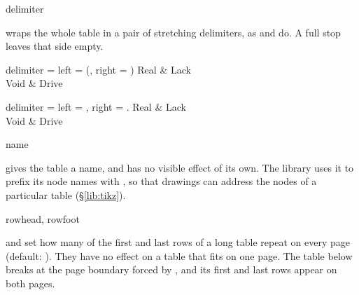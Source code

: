 \begin{codedescribe}[
    key,
    new=2022D
  ]{delimiter}
  \begin{codesyntax}
  \end{codesyntax}
   wraps the whole table in a pair of stretching delimiters, as  and  do. A full stop leaves that side empty.

  \begin{codestore}[st=table:delimiter]
    \begin{tblr}{delimiter = {left = (, right = )}}
      Real & Lack  \\
      Void & Drive
    \end{tblr}\quad
    \begin{tblr}{delimiter = {left = \lbrace, right = .}}
      Real & Lack  \\
      Void & Drive
    \end{tblr}\end{codestore}
  \begin{center}
  \end{center}
\end{codedescribe}

\begin{codedescribe}[
    key,
    new=2025A
  ]{name}
  \begin{codesyntax}
  \end{codesyntax}
   gives the table a name, and has no visible effect of its own. The  library uses it to prefix its node names with \vrb{-}, so that drawings can address the nodes of a particular table (\S\ref{lib:tikz}).
\end{codedescribe}

\begin{codedescribe}[
    key,
    new=2021L
  ]{rowhead, rowfoot}
  \begin{codesyntax}
  \end{codesyntax}
   and  set how many of the first and last rows of a long table repeat on every page (default: ). They have no effect on a table that fits on one page. The table below breaks at the page boundary forced by , and its first and last rows appear on both pages.
\end{codedescribe}

